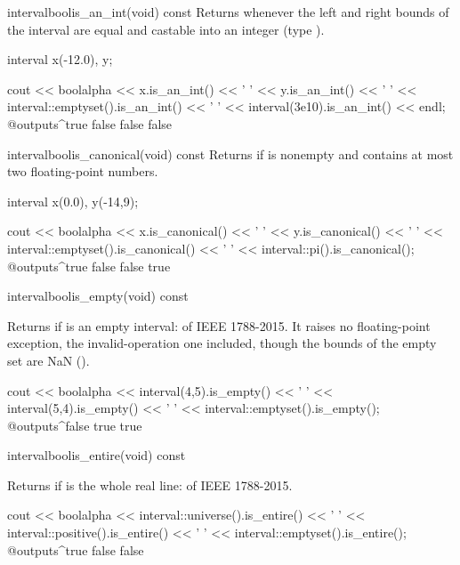 \documentclass[12pt,a4paper,twoside,openright]{book}
\begin{document}
\begin{defmethod}{interval}{bool}{is\_an\_int}{(void) const}
  Returns  whenever the left and right bounds of the interval
  are equal and castable into an integer (type ).
\begin{example}
interval x(-12.0), y;

cout << boolalpha << x.is_an_int() << ' ' << y.is_an_int() << ' '
     << interval::emptyset().is_an_int() << ' '
     << interval(3e10).is_an_int() << endl;
@outputs^true false false false~
\end{example}
\end{defmethod}

\begin{defmethod}{interval}{bool}{is\_canonical}{(void) const}
  Returns  if  is nonempty and contains at most two
  floating-point numbers.
\begin{example}
interval x(0.0), y(-14,9);

cout << boolalpha << x.is_canonical() << ' '
     << y.is_canonical() << ' '
     << interval::emptyset().is_canonical() << ' '
     << interval::pi().is_canonical();
@outputs^true false false true~
\end{example}
\end{defmethod}

\begin{defmethod}{interval}{bool}{is\_empty}{(void) const}
  \begin{operation}
  \end{operation}
  Returns  if  is an empty interval:  of
  IEEE 1788-2015. It raises no floating-point exception, the
  invalid-operation one included, though the bounds of the empty set are NaN
  ().\newinvfive
  \begin{example}
cout << boolalpha << interval(4,5).is_empty() << ' '
     << interval(5,4).is_empty() << ' '
     << interval::emptyset().is_empty();
@outputs^false true true~
  \end{example}
\end{defmethod}

\begin{defmethod}{interval}{bool}{is\_entire}{(void) const}
  \begin{operation}
  \end{operation}
  Returns  if  is the whole real line: 
  of IEEE 1788-2015.\newinvfive
  \begin{example}
cout << boolalpha << interval::universe().is_entire() << ' '
     << interval::positive().is_entire() << ' '
     << interval::emptyset().is_entire();
@outputs^true false false~
  \end{example}
\end{defmethod}
\end{document}
